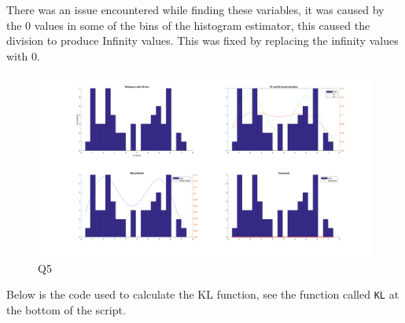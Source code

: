 There was an issue encountered while finding these variables, it was caused by the 0 values in some of the bins of the histogram estimator, this caused the division to produce Infinity values. This was fixed by replacing the infinity values with 0.

\begin{figure}[H]
    \includegraphics[width=\linewidth]{../../pracs/week4/images/q5}
    \centering
    \caption{Q5}
\end{figure}

Below is the code used to calculate the KL function, see the function called \texttt{KL} at the bottom of the script.




